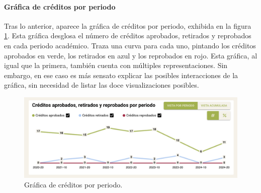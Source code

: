 \paragraph{Gráfica de créditos por periodo} Tras lo anterior, aparece la gráfica de créditos por periodo, exhibida en la figura \ref{fig:grafica_creditos}. Esta gráfica desglosa el número de créditos aprobados, retirados y reprobados en cada periodo académico. Traza una curva para cada uno, pintando los créditos aprobados en verde, los retirados en azul y los reprobados en rojo. Esta gráfica, al igual que la primera, también cuenta con múltiples representaciones. Sin embargo, en ese caso es más sensato explicar las posibles interacciones de la gráfica, sin necesidad de listar las doce visualizaciones posibles.

\begin{figure}[H]
	\centering
	\includegraphics[width=\textwidth]{assets/nes/grafica_creditos.png}
	\caption{Gráfica de créditos por periodo.}
	\label{fig:grafica_creditos}
\end{figure}

